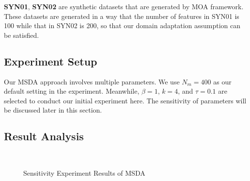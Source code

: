 \textbf{SYN01}, \textbf{SYN02} are synthetic datasets that are generated by MOA framework. These datasets are generated in a way that the number of features in SYN01 is 100 while that in SYN02 is 200, so that our domain adaptation assumption can be satisfied.

\subsection{Experiment Setup}
Our MSDA approach involves multiple parameters. We use $N_m = 400$ as our default setting in the experiment. Meanwhile, $\beta = 1$, $k = 4$, and $\tau = 0.1$ are selected to conduct our initial experiment here. The sensitivity of parameters will be discussed later in this section.

\subsection{Result Analysis}

\begin{figure}[t]
   \centering
    \\
   \caption{Sensitivity Experiment Results of MSDA}
   \label{fig:sensitivity}
\end{figure}


